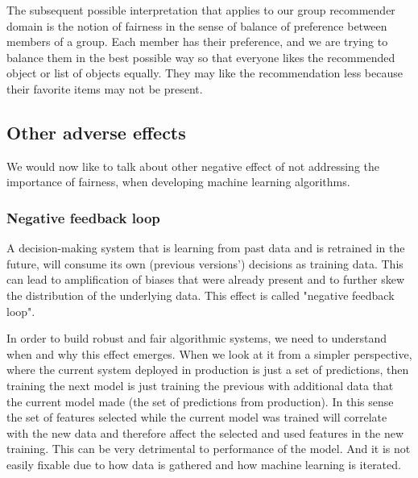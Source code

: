 The subsequent possible interpretation that applies to our group recommender domain is the notion of fairness in the sense of balance of preference between members of a group. Each member has their preference, and we are trying to balance them in the best possible way so that everyone likes the recommended object or list of objects equally. They may like the recommendation less because their favorite items may not be present.


\subsection{Other adverse effects}

We would now like to talk about other negative effect of not addressing the importance of fairness, when developing machine learning algorithms.

\subsubsection{Negative feedback loop}

A decision-making system that is learning from past data and is retrained in the future, will consume its own (previous versions') decisions as training data. This can lead to amplification of biases that were already present and to further skew the distribution of the underlying data. This effect is called "negative feedback loop".

In order to build robust and fair algorithmic systems, we need to understand when and why this effect emerges. When we look at it from a simpler perspective, where the current system deployed in production is just a set of predictions, then training the next model is just training the previous with additional data that the current model made (the set of predictions from production). In this sense the set of features selected while the current model was trained will correlate with the new data and therefore affect the selected and used features in the new training. This can be very detrimental to performance of the model. And it is not easily fixable due to how data is gathered and how machine learning is iterated.

